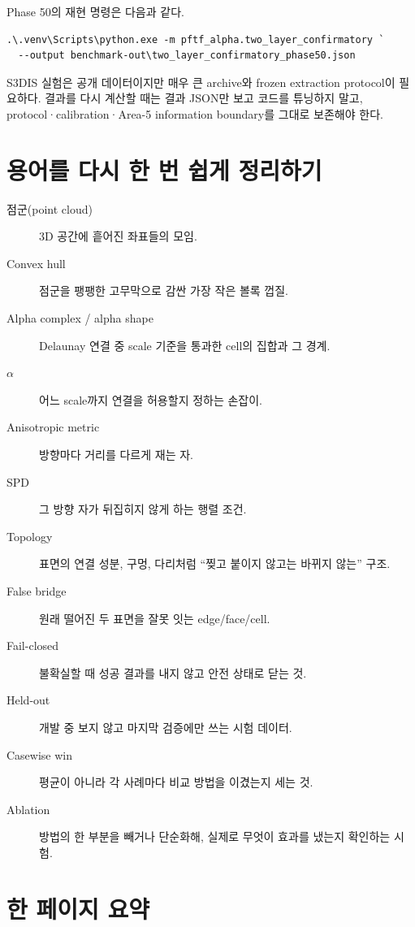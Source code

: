 \documentclass[11pt,a4paper]{article}
\begin{document}
Phase 50의 재현 명령은 다음과 같다.

\begin{verbatim}
.\.venv\Scripts\python.exe -m pftf_alpha.two_layer_confirmatory `
  --output benchmark-out\two_layer_confirmatory_phase50.json
\end{verbatim}

S3DIS 실험은 공개 데이터이지만 매우 큰 archive와 frozen extraction protocol이
필요하다. 결과를 다시 계산할 때는 결과 JSON만 보고 코드를 튜닝하지 말고,
protocol·calibration·Area-5 information boundary를 그대로 보존해야 한다.

\section{용어를 다시 한 번 쉽게 정리하기}

\begin{description}
  \item[점군(point cloud)] 3D 공간에 흩어진 좌표들의 모임.
  \item[Convex hull] 점군을 팽팽한 고무막으로 감싼 가장 작은 볼록 껍질.
  \item[Alpha complex / alpha shape] Delaunay 연결 중 scale 기준을 통과한
  cell의 집합과 그 경계.
  \item[$\alpha$] 어느 scale까지 연결을 허용할지 정하는 손잡이.
  \item[Anisotropic metric] 방향마다 거리를 다르게 재는 자.
  \item[SPD] 그 방향 자가 뒤집히지 않게 하는 행렬 조건.
  \item[Topology] 표면의 연결 성분, 구멍, 다리처럼 ``찢고 붙이지 않고는
  바뀌지 않는'' 구조.
  \item[False bridge] 원래 떨어진 두 표면을 잘못 잇는 edge/face/cell.
  \item[Fail-closed] 불확실할 때 성공 결과를 내지 않고 안전 상태로 닫는 것.
  \item[Held-out] 개발 중 보지 않고 마지막 검증에만 쓰는 시험 데이터.
  \item[Casewise win] 평균이 아니라 각 사례마다 비교 방법을 이겼는지 세는 것.
  \item[Ablation] 방법의 한 부분을 빼거나 단순화해, 실제로 무엇이 효과를 냈는지
  확인하는 시험.
\end{description}

\section*{한 페이지 요약}
\end{document}

